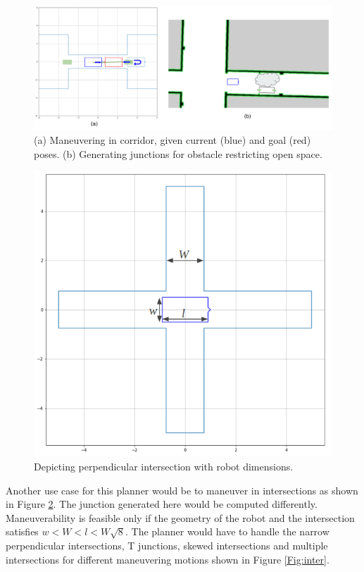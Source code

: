 \documentclass[rnd]{mas_proposal}
\begin{document}
\begin{figure}[!ht]
\centering
\includegraphics[scale=0.45]{images/maneuver.png}
\caption{(a) Maneuvering in corridor, given current (blue) and goal (red) poses. (b) Generating junctions for obstacle restricting open space.}
\label{Fig:maneuver}
\end{figure}

\begin{figure}[!ht]
\centering
\includegraphics[scale=0.39]{images/intersection.png}
\caption{Depicting perpendicular intersection with robot dimensions.}
\label{Fig:intersect}
\end{figure}

Another use case for this planner would be to maneuver in intersections as shown in Figure \ref{Fig:intersect}. The junction generated here would be computed differently. Maneuverability is feasible only if the geometry of the robot and the intersection satisfies $w < W < l < W\sqrt{8}$. The planner would have to handle the narrow perpendicular intersections, T junctions, skewed intersections and multiple intersections for different maneuvering motions shown in Figure \ref{Fig:inter}.
\end{document}
